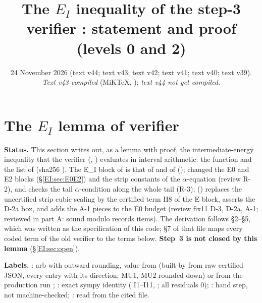 \documentclass[11pt]{article}
\title{The $E_I$ inequality of the step-3 verifier \fn{fin13v4c}: statement and proof (levels 0 and 2)}
\author{}\date{24 November 2026 (text v44; text v43; text v42; text v41; text v40; text v39). \emph{Text v43 compiled} (MiKTeX, \fn{fix26_latex_v43/LATEX_v43.md}); \emph{text v44 not yet compiled.}}
\begin{document}
\maketitle
\fi
\providecommand{\Dv}{\mathcal D_V}

\section[The $E_I$ lemma of verifier fin13v4c]{The $E_I$ lemma of verifier }\label{EI:sec}
\noindent\textbf{Status.} This section writes out, as a lemma with proof, the intermediate-energy inequality that the verifier  (, ) evaluates in interval arithmetic: the function  and the list  of  (sha256 ). The E\_I block of  is that of  and of  ();  changed the E0 and E2 blocks (\S\ref{EI:sec:E0E2}) and the strip constants of the $\alpha$-equation (review R-2), and checks the tail $\alpha$-condition along the whole tail (R-3);  () replaces the uncertified strip cubic scaling  by the certified term H8 of the E block, asserts the D-2a box, and adds the A-1 pieces to the E0 budget (review fix11 D-3, D-2a, A-1; reviewed in  part A: sound modulo records items). The derivation follows  \S2--\S5, which was written as the specification of this code; \S7 of that file maps every coded term of the old verifier  to the terms below. \textbf{Step~3 is not closed by this lemma} (\S\ref{EI:sec:open}).

\noindent\textbf{Labels.} \tC: arb with outward rounding, value from  (built by  from raw certified JSON, every entry with its direction; MU1, MU2 rounded down) or from the production run ; \tS: exact sympy identity ( I1--I11, ; all residuals 0); \tHd: hand step, not machine-checked; \tR: read from the cited file.
\end{document}
